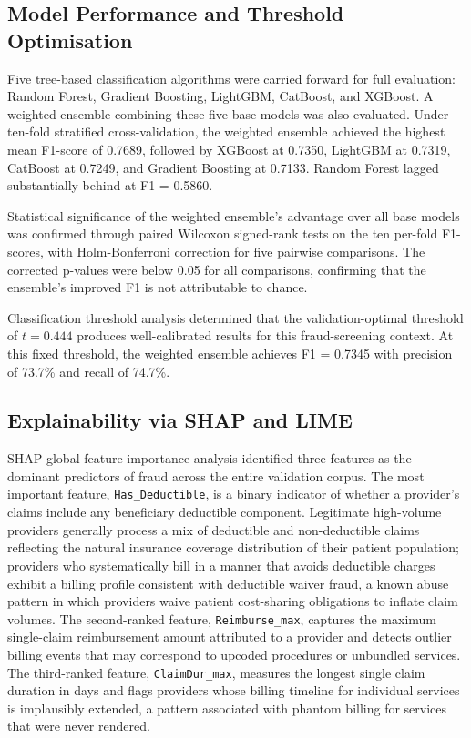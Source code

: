 \subsection{Model Performance and Threshold Optimisation}

Five tree-based classification algorithms were carried forward for full evaluation: Random Forest, Gradient Boosting, LightGBM, CatBoost, and XGBoost. A weighted ensemble combining these five base models was also evaluated. Under ten-fold stratified cross-validation, the weighted ensemble achieved the highest mean F1-score of 0.7689, followed by XGBoost at 0.7350, LightGBM at 0.7319, CatBoost at 0.7249, and Gradient Boosting at 0.7133. Random Forest lagged substantially behind at F1 = 0.5860.

Statistical significance of the weighted ensemble's advantage over all base models was confirmed through paired Wilcoxon signed-rank tests on the ten per-fold F1-scores, with Holm-Bonferroni correction for five pairwise comparisons. The corrected p-values were below 0.05 for all comparisons, confirming that the ensemble's improved F1 is not attributable to chance.

Classification threshold analysis determined that the validation-optimal threshold of $t=0.444$ produces well-calibrated results for this fraud-screening context. At this fixed threshold, the weighted ensemble achieves F1 = 0.7345 with precision of 73.7\% and recall of 74.7\%.

\subsection{Explainability via SHAP and LIME}

SHAP global feature importance analysis identified three features as the dominant predictors of fraud across the entire validation corpus. The most important feature, \texttt{Has\_Deductible}, is a binary indicator of whether a provider's claims include any beneficiary deductible component. Legitimate high-volume providers generally process a mix of deductible and non-deductible claims reflecting the natural insurance coverage distribution of their patient population; providers who systematically bill in a manner that avoids deductible charges exhibit a billing profile consistent with deductible waiver fraud, a known abuse pattern in which providers waive patient cost-sharing obligations to inflate claim volumes. The second-ranked feature, \texttt{Reimburse\_max}, captures the maximum single-claim reimbursement amount attributed to a provider and detects outlier billing events that may correspond to upcoded procedures or unbundled services. The third-ranked feature, \texttt{ClaimDur\_max}, measures the longest single claim duration in days and flags providers whose billing timeline for individual services is implausibly extended, a pattern associated with phantom billing for services that were never rendered.

